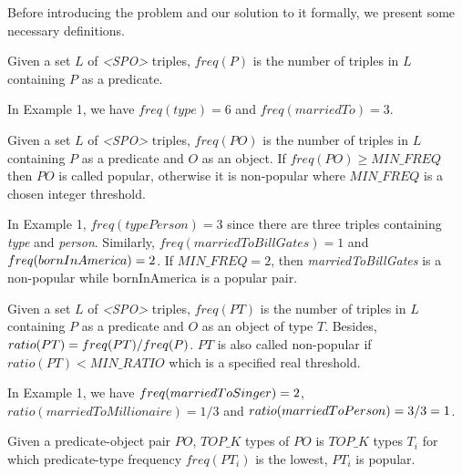 Before introducing the problem and our solution to it formally, we present some necessary definitions.

\begin{definition}%
\label{def1}
Given a set $L$ of \textit{<SPO>} triples, $freq(P)$ is the number of triples in $L$ containing $P$ as a predicate.
\end{definition}

\begin{example}
\label{ex2}
In Example 1, we have $freq(type) = 6$ and $freq(marriedTo) = 3$.
\end{example}

\begin{definition}%
\label{def2}
Given a set $L$ of \textit{<SPO>} triples, $freq(PO)$ is the number of triples in $L$ containing $P$ as a predicate and $O$ as an object. If $freq(PO) \geq MIN\_FREQ$ then $PO$ is called popular, otherwise it is non-popular where $MIN\_FREQ$ is a chosen integer threshold.
\end{definition}

\begin{example}
\label{ex3}
In Example 1, $freq(typePerson) = 3$ since there are three triples containing \textit{type} and \textit{person}. Similarly, $freq(marriedToBillGates) = 1$ and $freq(bornInAmerica)\\ = 2$. If $MIN\_FREQ = 2$, then \textit{marriedToBillGates} is a non-popular while bornInAmerica is a popular pair.
\end{example}

\begin{definition}%
\label{def3}
Given a set $L$ of \textit{<SPO>} triples, $freq(PT)$ is the number of triples in $L$ containing $P$ as a predicate and $O$ as an object of type $T$. Besides, $ratio(PT) = freq(PT) /\\ freq(P)$. $PT$ is also called non-popular if $ratio(PT) < MIN\_RATIO$ which is a specified real threshold.
\end{definition}

\begin{example}
\label{ex4}
In Example 1, we have $freq(marriedToSinger)\\ = 2$, $ratio(marriedToMillionaire) = 1 / 3$ and $ratio(married\\ToPerson) = 3 / 3 = 1$.
\end{example}

\begin{definition}%
\label{def4}
Given a predicate-object pair $PO$, $TOP\_K$ types of $PO$ is $TOP\_K$ types $T_{i}$ for which predicate-type frequency $freq(PT_{i})$ is the lowest, $PT_{i}$ is popular.
\end{definition}

